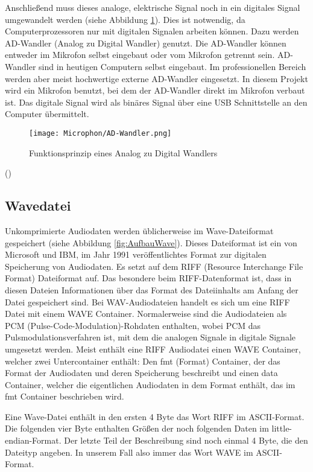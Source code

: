Anschließend muss dieses analoge, elektrische Signal noch in ein digitales Signal umgewandelt werden (siehe Abbildung \ref{fig:AD-Wandler}). Dies ist notwendig, da Computerprozessoren nur mit digitalen Signalen arbeiten können. 
Dazu werden AD-Wandler (Analog zu Digital Wandler) genutzt. 
Die AD-Wandler können entweder im Mikrofon selbst eingebaut oder vom Mikrofon getrennt sein.
AD-Wandler sind in heutigen Computern selbst eingebaut. 
Im professionellen Bereich werden aber meist hochwertige externe AD-Wandler
eingesetzt.
In diesem Projekt wird ein Mikrofon benutzt, bei dem der AD-Wandler direkt im Mikrofon verbaut ist. Das digitale 
Signal wird als binäres Signal über eine USB Schnittstelle an den Computer übermittelt.

\begin{figure}[ht]
    \centering
    \texttt{[image: Microphon/AD-Wandler.png]}
    \caption{Funktionsprinzip eines Analog zu Digital Wandlers}
    \label{fig:AD-Wandler}
\end{figure}
(\cite{Weinzierl:2020})

\subsection{Wavedatei}

Unkomprimierte Audiodaten werden üblicherweise im Wave-Dateiformat gespeichert (siehe Abbildung \ref{fig:AufbauWave}). Dieses Dateiformat ist ein von 
Microsoft und IBM, im Jahr 1991 veröffentlichtes Format zur digitalen Speicherung von Audiodaten.
Es setzt auf dem RIFF (Resource Interchange File Format) Dateiformat auf.
Das besondere beim RIFF-Datenformat ist, dass in diesen Dateien Informationen über das Format des Dateiinhalts 
am Anfang der Datei gespeichert sind.
Bei WAV-Audiodateien handelt es sich um eine RIFF Datei mit einem WAVE Container. 
Normalerweise sind die Audiodateien als  PCM (Pulse-Code-Modulation)-Rohdaten enthalten, wobei PCM das Pulsmodulationsverfahren ist, mit dem die analogen Signale in digitale Signale umgesetzt werden.
Meist enthält eine RIFF Audiodatei einen WAVE Container, welcher zwei Untercontainer enthält:
Den fmt (Format) Container, der das Format der Audiodaten und deren Speicherung beschreibt und 
einen data Container, welcher die eigentlichen Audiodaten in dem Format enthält, das im fmt Container beschrieben wird.

Eine Wave-Datei enthält in den ersten 4 Byte das Wort RIFF im ASCII-Format.
Die folgenden vier Byte enthalten Größen der noch folgenden Daten im little-endian-Format.  Der letzte Teil der Beschreibung sind noch einmal 4 Byte, die den Dateityp angeben. 
In unserem Fall also immer das Wort WAVE im ASCII-Format.


